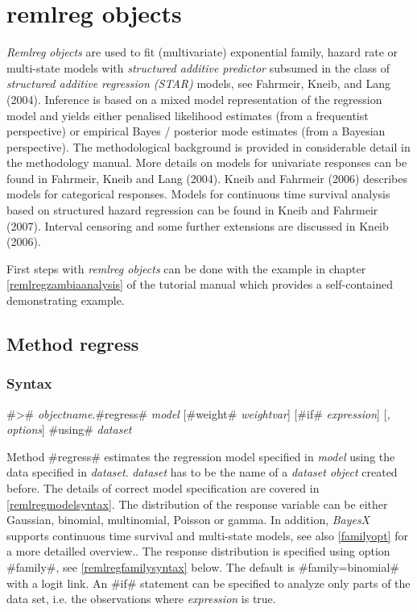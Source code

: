 \chapter{remlreg objects}\normalsize
\label{remlreg} 

{\em Remlreg objects} are used to fit (multivariate) exponential
family, hazard rate or multi-state models with {\em structured
additive predictor} subsumed in the class of {\em structured
additive regression (STAR)} models, see Fahrmeir, Kneib, and Lang
(2004). Inference is based on a mixed model representation of the
regression model and yields either penalised likelihood estimates
(from a frequentist perspective) or empirical Bayes / posterior
mode estimates (from a Bayesian perspective). The methodological
background is provided in considerable detail in the methodology
manual. More details on models for univariate responses can be
found in Fahrmeir, Kneib and Lang (2004). Kneib and Fahrmeir
(2006) describes models for categorical responses. Models for
continuous time survival analysis based on structured hazard
regression can be found in Kneib and Fahrmeir (2007). Interval
censoring and some further extensions are discussed in Kneib
(2006).

First steps with {\em remlreg objects} can be done with the
example in chapter \ref*{remlregzambiaanalysis} of the tutorial
manual which provides a self-contained demonstrating example.

\section{Method regress}
\label{remlregregress}

\subsection{Syntax}
\label{remlregregresssyntax}

 #># {\em objectname}.#regress# {\em model} [#weight# {\em weightvar}] [#if# {\em expression}] [{\em , options}] #using# {\em dataset}

Method #regress# estimates the regression model specified in {\em
model} using the data specified in {\em dataset}. {\em dataset}
has to be the name of a {\em dataset object} created before. The
details of correct model specification are covered in
\autoref{remlregmodelsyntax}. The distribution of the response
variable can be either Gaussian, binomial, multinomial, Poisson or
gamma. In addition, {\em BayesX} supports continuous time survival
and multi-state models, see also \autoref{familyopt} for a more
detailled overview.. The response distribution is specified using
option #family#, see \autoref{remlregfamilysyntax} below. The
default is #family=binomial# with a logit link. An #if# statement
can be specified to analyze only parts of the data set, i.e. the
observations where {\em expression} is true.

